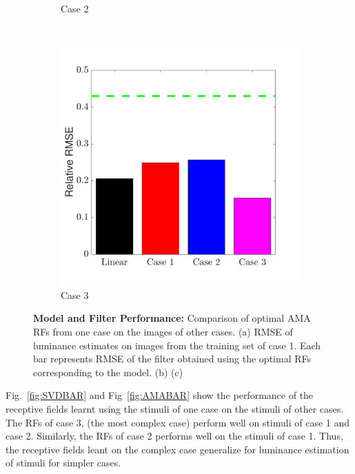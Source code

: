 \documentclass{jov}
\begin{document}
\begin{figure}
\begin{subfigure}{0.3 \textwidth}
	\caption{Case 2}
	\label{fig:case2Bar}
    \end{subfigure}
    ~ 
        \begin{subfigure}{0.3 \textwidth}
	\includegraphics[width=\textwidth]{../Figures/Figure13/Figure13_c.pdf}
	\caption{Case 3}
	\label{fig:case3Bar}
    \end{subfigure}
\caption{{\bf Model and Filter Performance:} Comparison of optimal AMA RFs from one case on the images of other cases. (a) RMSE of luminance estimates on images from the training set of case 1. Each bar represents RMSE of the filter obtained using the optimal RFs corresponding to the model. (b) (c)}
 \label{fig:barGraphs}
\end{figure}
Fig.~\ref{fig:SVDBAR} and Fig~\ref{fig:AMABAR} show the performance of the receptive fields learnt using the stimuli of one case on the stimuli of other cases. The RFs of case 3, (the most complex case) perform well on stimuli of case 1 and case 2.  Similarly, the RFs of case 2 performs well on the stimuli of case 1. Thus, the receptive fields leant on the complex case generalize for luminance estimation of stimuli for simpler cases.
\end{document}
